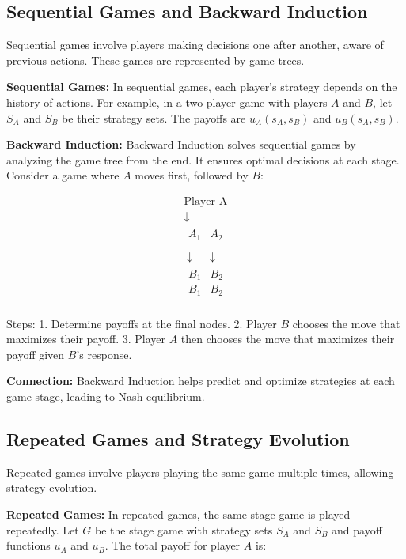 \documentclass[12pt]{book} %
\begin{document}
\subsection{Sequential Games and Backward Induction}

Sequential games involve players making decisions one after another, aware of previous actions. These games are represented by game trees.

\textbf{Sequential Games:}
In sequential games, each player's strategy depends on the history of actions. For example, in a two-player game with players \( A \) and \( B \), let \( S_A \) and \( S_B \) be their strategy sets. The payoffs are \( u_A(s_A, s_B) \) and \( u_B(s_A, s_B) \).

\textbf{Backward Induction:}
Backward Induction solves sequential games by analyzing the game tree from the end. It ensures optimal decisions at each stage. Consider a game where \( A \) moves first, followed by \( B \):

\[
\begin{array}{c}
\text{Player A} \\
\downarrow \\
\begin{array}{c|c}
A_1 & A_2 \\
\end{array} \\
\downarrow \quad \downarrow \\
\begin{array}{cc}
B_1 & B_2 \\
B_1 & B_2 \\
\end{array}
\end{array}
\]

Steps:
1. Determine payoffs at the final nodes.
2. Player \( B \) chooses the move that maximizes their payoff.
3. Player \( A \) then chooses the move that maximizes their payoff given \( B \)'s response.

\textbf{Connection:}
Backward Induction helps predict and optimize strategies at each game stage, leading to Nash equilibrium.

\subsection{Repeated Games and Strategy Evolution}

Repeated games involve players playing the same game multiple times, allowing strategy evolution.

\textbf{Repeated Games:}
In repeated games, the same stage game is played repeatedly. Let \( G \) be the stage game with strategy sets \( S_A \) and \( S_B \) and payoff functions \( u_A \) and \( u_B \). The total payoff for player \( A \) is:
\end{document}
